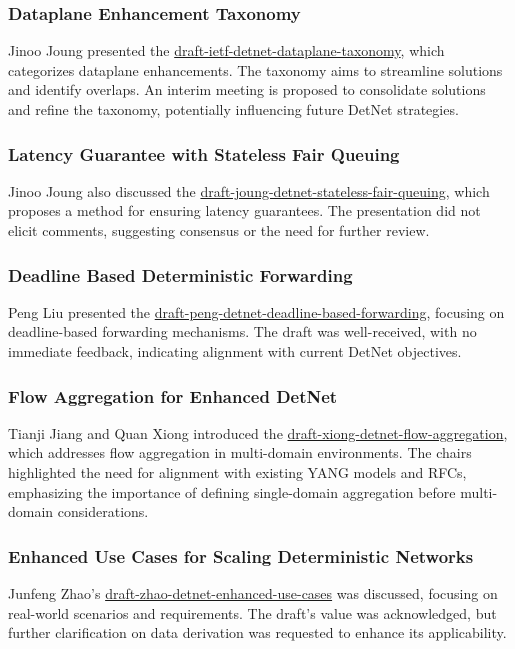 \documentclass{article}
\begin{document}
\subsubsection{Dataplane Enhancement Taxonomy}
Jinoo Joung presented the \href{https://datatracker.ietf.org/doc/draft-ietf-detnet-dataplane-taxonomy/02}{draft-ietf-detnet-dataplane-taxonomy}, which categorizes dataplane enhancements. The taxonomy aims to streamline solutions and identify overlaps. An interim meeting is proposed to consolidate solutions and refine the taxonomy, potentially influencing future DetNet strategies.

\subsubsection{Latency Guarantee with Stateless Fair Queuing}
Jinoo Joung also discussed the \href{https://datatracker.ietf.org/doc/draft-joung-detnet-stateless-fair-queuing/04}{draft-joung-detnet-stateless-fair-queuing}, which proposes a method for ensuring latency guarantees. The presentation did not elicit comments, suggesting consensus or the need for further review.

\subsubsection{Deadline Based Deterministic Forwarding}
Peng Liu presented the \href{https://datatracker.ietf.org/doc/draft-peng-detnet-deadline-based-forwarding/14}{draft-peng-detnet-deadline-based-forwarding}, focusing on deadline-based forwarding mechanisms. The draft was well-received, with no immediate feedback, indicating alignment with current DetNet objectives.

\subsubsection{Flow Aggregation for Enhanced DetNet}
Tianji Jiang and Quan Xiong introduced the \href{https://datatracker.ietf.org/doc/draft-xiong-detnet-flow-aggregation/02}{draft-xiong-detnet-flow-aggregation}, which addresses flow aggregation in multi-domain environments. The chairs highlighted the need for alignment with existing YANG models and RFCs, emphasizing the importance of defining single-domain aggregation before multi-domain considerations.

\subsubsection{Enhanced Use Cases for Scaling Deterministic Networks}
Junfeng Zhao's \href{https://datatracker.ietf.org/doc/draft-zhao-detnet-enhanced-use-cases/02/}{draft-zhao-detnet-enhanced-use-cases} was discussed, focusing on real-world scenarios and requirements. The draft's value was acknowledged, but further clarification on data derivation was requested to enhance its applicability.
\end{document}
